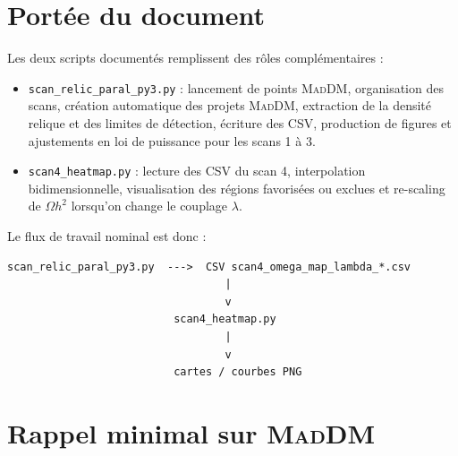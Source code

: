 \documentclass[11pt,a4paper]{article}
\newcommand{\script}[1]{\texttt{#1}}
\newcommand{\mad}{\textsc{MadDM}}
\newcommand{\mg}{\textsc{MG5\_aMC}}
\begin{document}
\begin{abstract}
\mad\ est un outil numérique automatisé construit dans l'écosystème \mg\ pour l'étude phénoménologique de la matière noire. Il permet notamment de calculer la densité relique thermique, des observables de détection directe et des observables de détection indirecte dans des modèles génériques importés sous forme UFO. Les publications \emph{MadDM v2.0} et \emph{MadDM v3.2} montrent l'extension progressive du code vers la détection directe, puis vers des observables de détection indirecte plus avancées, y compris certains processus induits à une boucle. Le présent document ne décrit pas l'ensemble de \mad, mais deux scripts d'automatisation qui l'encapsulent pour réaliser des scans systématiques et en visualiser les résultats.
\end{abstract}

\section{Portée du document}

Les deux scripts documentés remplissent des rôles complémentaires :

\begin{itemize}[leftmargin=1.4em]
\item \script{scan\_relic\_paral\_py3.py} : lancement de points \mad, organisation des scans, création automatique des projets \mad, extraction de la densité relique et des limites de détection, écriture des CSV, production de figures et ajustements en loi de puissance pour les scans 1 à 3.
\item \script{scan4\_heatmap.py} : lecture des CSV du scan 4, interpolation bidimensionnelle, visualisation des régions favorisées ou exclues et re-scaling de $\Omega h^2$ lorsqu'on change le couplage $\lambda$.
\end{itemize}

Le flux de travail nominal est donc :
\begin{lstlisting}[style=bashstyle]
scan_relic_paral_py3.py  --->  CSV scan4_omega_map_lambda_*.csv
                                  |
                                  v
                          scan4_heatmap.py
                                  |
                                  v
                          cartes / courbes PNG
\end{lstlisting}

\section{Rappel minimal sur \mad}
\end{document}
